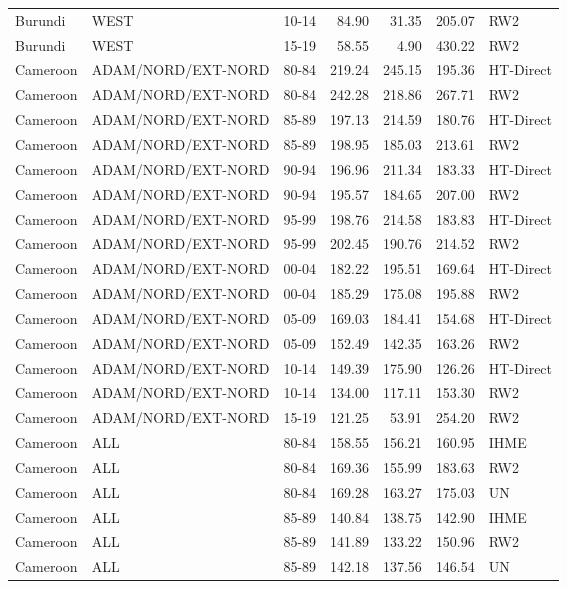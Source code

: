 \begin{longtable}{lllrrrl}
  Burundi & WEST & 10-14 & 84.90 & 31.35 & 205.07 & RW2 \\ 
  Burundi & WEST & 15-19 & 58.55 & 4.90 & 430.22 & RW2 \\ 
  Cameroon & ADAM/NORD/EXT-NORD & 80-84 & 219.24 & 245.15 & 195.36 & HT-Direct \\ 
  Cameroon & ADAM/NORD/EXT-NORD & 80-84 & 242.28 & 218.86 & 267.71 & RW2 \\ 
  Cameroon & ADAM/NORD/EXT-NORD & 85-89 & 197.13 & 214.59 & 180.76 & HT-Direct \\ 
  Cameroon & ADAM/NORD/EXT-NORD & 85-89 & 198.95 & 185.03 & 213.61 & RW2 \\ 
  Cameroon & ADAM/NORD/EXT-NORD & 90-94 & 196.96 & 211.34 & 183.33 & HT-Direct \\ 
  Cameroon & ADAM/NORD/EXT-NORD & 90-94 & 195.57 & 184.65 & 207.00 & RW2 \\ 
  Cameroon & ADAM/NORD/EXT-NORD & 95-99 & 198.76 & 214.58 & 183.83 & HT-Direct \\ 
  Cameroon & ADAM/NORD/EXT-NORD & 95-99 & 202.45 & 190.76 & 214.52 & RW2 \\ 
  Cameroon & ADAM/NORD/EXT-NORD & 00-04 & 182.22 & 195.51 & 169.64 & HT-Direct \\ 
  Cameroon & ADAM/NORD/EXT-NORD & 00-04 & 185.29 & 175.08 & 195.88 & RW2 \\ 
  Cameroon & ADAM/NORD/EXT-NORD & 05-09 & 169.03 & 184.41 & 154.68 & HT-Direct \\ 
  Cameroon & ADAM/NORD/EXT-NORD & 05-09 & 152.49 & 142.35 & 163.26 & RW2 \\ 
  Cameroon & ADAM/NORD/EXT-NORD & 10-14 & 149.39 & 175.90 & 126.26 & HT-Direct \\ 
  Cameroon & ADAM/NORD/EXT-NORD & 10-14 & 134.00 & 117.11 & 153.30 & RW2 \\ 
  Cameroon & ADAM/NORD/EXT-NORD & 15-19 & 121.25 & 53.91 & 254.20 & RW2 \\ 
  Cameroon & ALL & 80-84 & 158.55 & 156.21 & 160.95 & IHME \\ 
  Cameroon & ALL & 80-84 & 169.36 & 155.99 & 183.63 & RW2 \\ 
  Cameroon & ALL & 80-84 & 169.28 & 163.27 & 175.03 & UN \\ 
  Cameroon & ALL & 85-89 & 140.84 & 138.75 & 142.90 & IHME \\ 
  Cameroon & ALL & 85-89 & 141.89 & 133.22 & 150.96 & RW2 \\ 
  Cameroon & ALL & 85-89 & 142.18 & 137.56 & 146.54 & UN \\ 

\end{longtable}
